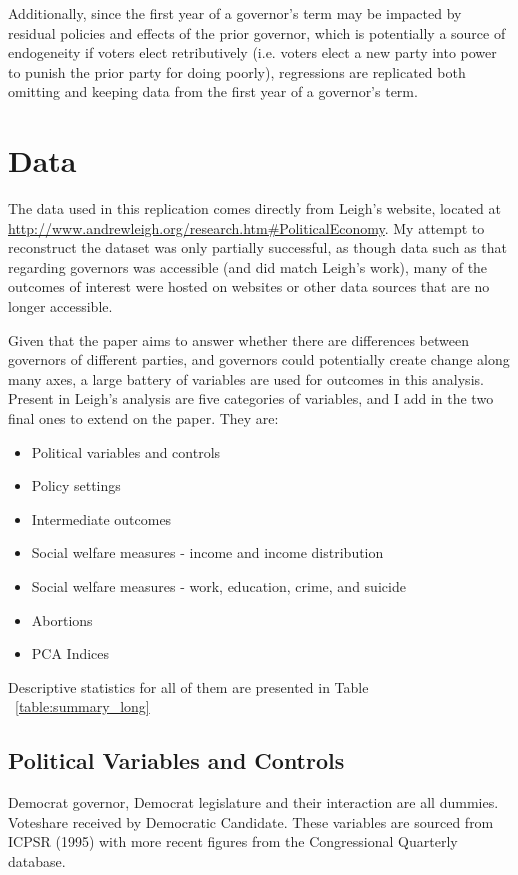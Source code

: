 \documentclass{article}
\begin{document}
Additionally, since the first year of a governor's term may be impacted by residual policies and effects of the prior governor, which is potentially a source of endogeneity if voters elect retributively (i.e. voters elect a new party into power to punish the prior party for doing poorly), regressions are replicated both omitting and keeping data from the first year of a governor's term.


\section{Data}

The data used in this replication comes directly from Leigh's website, located at \url{http://www.andrewleigh.org/research.htm#PoliticalEconomy}. My attempt to reconstruct the dataset was only partially successful, as though data such as that regarding governors was accessible (and did match Leigh's work), many of the outcomes of interest were hosted on websites or other data sources that are no longer accessible.

Given that the paper aims to answer whether there are differences between governors of different parties, and governors could potentially create change along many axes, a large battery of variables are used for outcomes in this analysis. Present in Leigh's analysis are five categories of variables, and I add in the two final ones to extend on the paper. They are:
\begin{itemize}
\item Political variables and controls
\item Policy settings
\item Intermediate outcomes
\item Social welfare measures - income and income distribution
\item Social welfare measures - work, education, crime, and suicide
\item Abortions
\item PCA Indices
\end{itemize}

Descriptive statistics for all of them are presented in Table ~\ref{table:summary_long}

\subsection{Political Variables and Controls}

Democrat governor, Democrat legislature and their interaction are all dummies. Voteshare received by Democratic Candidate. These variables are sourced from ICPSR (1995) with more recent figures from the Congressional Quarterly database. 
\end{document}
